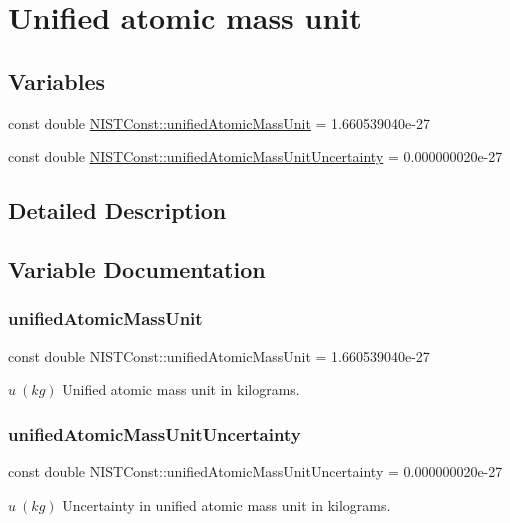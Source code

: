 \hypertarget{group___n_i_s_t_const-_unified_atomic_mass_unit}{}\section{Unified atomic mass unit}
\label{group___n_i_s_t_const-_unified_atomic_mass_unit}
\subsection*{Variables}
\begin{DoxyCompactItemize}
\item 
const double \hyperlink{group___n_i_s_t_const-_unified_atomic_mass_unit_ga5dbf5ee7e0ef084434d647e917855f39}{N\+I\+S\+T\+Const\+::unified\+Atomic\+Mass\+Unit} = 1.\+660539040e-\/27
\item 
const double \hyperlink{group___n_i_s_t_const-_unified_atomic_mass_unit_ga28042f56f970858ec82e0279a88996f4}{N\+I\+S\+T\+Const\+::unified\+Atomic\+Mass\+Unit\+Uncertainty} = 0.\+000000020e-\/27
\end{DoxyCompactItemize}


\subsection{Detailed Description}


\subsection{Variable Documentation}
\mbox{\label{group___n_i_s_t_const-_unified_atomic_mass_unit_ga5dbf5ee7e0ef084434d647e917855f39}} 
\subsubsection{\texorpdfstring{unified\+Atomic\+Mass\+Unit}{unifiedAtomicMassUnit}}
{\footnotesize\ttfamily const double N\+I\+S\+T\+Const\+::unified\+Atomic\+Mass\+Unit = 1.\+660539040e-\/27}

$u \ (kg)$ Unified atomic mass unit in kilograms. \mbox{\label{group___n_i_s_t_const-_unified_atomic_mass_unit_ga28042f56f970858ec82e0279a88996f4}} 
\subsubsection{\texorpdfstring{unified\+Atomic\+Mass\+Unit\+Uncertainty}{unifiedAtomicMassUnitUncertainty}}
{\footnotesize\ttfamily const double N\+I\+S\+T\+Const\+::unified\+Atomic\+Mass\+Unit\+Uncertainty = 0.\+000000020e-\/27}

$u \ (kg)$ Uncertainty in unified atomic mass unit in kilograms. 